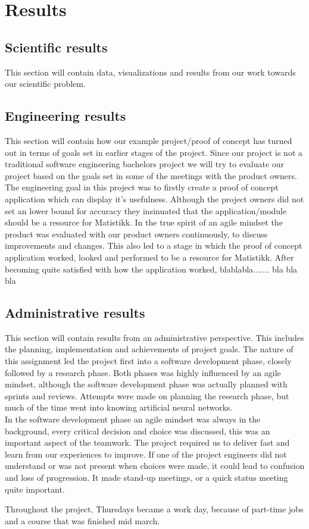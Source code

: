 \chapter{Results}

\section{Scientific results}
This section will contain data, visualizations and results from our work towards our scientific problem. 

\section{Engineering results}
This section will contain how our example project/proof of concept has turned out in terms of goals set in earlier stages of the project. Since our project is not a traditional software engineering bachelors project we will try to evaluate our project based on the goals set in some of the meetings with the product owners. %
%
The engineering goal in this project was to firstly create a proof of concept application which can display it's usefulness. Although the project owners did not set an lower bound for accuracy they insinuated that the application/module should be a resource for Matistikk. In the true spirit of an agile mindset the product was evaluated with our product owners continuously, to discuss improvements and changes. This also led to a stage in which the proof of concept application worked, looked and performed to be a resource for Matistikk. After becoming quite satisfied with how the application worked, blablabla....... bla bla bla

% 

% 
\section{Administrative results}
This section will contain results from an administrative perspective. This includes the planning, implementation and achievements of project goals.
\quad
The nature of this assignment led the project first into a software development phase, closely followed by a research phase. Both phases was highly influenced by an agile mindset, although the software development phase was actually planned with sprints and reviews. Attempts were made on planning the research phase, but much of the time went into knowing artificial neural networks. \\
In the software development phase an agile mindset was always in the background, every critical decision and choice was discussed, this was an important aspect of the teamwork. The project required us to deliver fast and learn from our experiences to improve. If one of the project engineers did not understand or was not present when choices were made, it could lead to confusion and loss of progression. It made stand-up meetings, or a quick status meeting quite important.






Throughout the project, Thursdays became a work day, because of part-time jobs and a course that was finished mid march.


